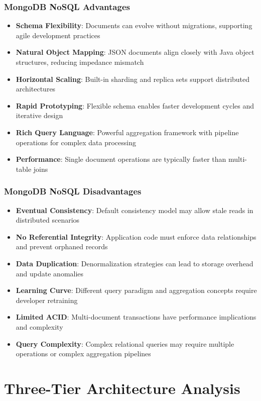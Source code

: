 \documentclass[12pt,a4paper]{article}
\begin{document}
\subsubsection{MongoDB NoSQL Advantages}
\begin{itemize}
    \item \textbf{Schema Flexibility}: Documents can evolve without migrations, supporting agile development practices
    \item \textbf{Natural Object Mapping}: JSON documents align closely with Java object structures, reducing impedance mismatch
    \item \textbf{Horizontal Scaling}: Built-in sharding and replica sets support distributed architectures
    \item \textbf{Rapid Prototyping}: Flexible schema enables faster development cycles and iterative design
    \item \textbf{Rich Query Language}: Powerful aggregation framework with pipeline operations for complex data processing
    \item \textbf{Performance}: Single document operations are typically faster than multi-table joins
\end{itemize}

\subsubsection{MongoDB NoSQL Disadvantages}
\begin{itemize}
    \item \textbf{Eventual Consistency}: Default consistency model may allow stale reads in distributed scenarios
    \item \textbf{No Referential Integrity}: Application code must enforce data relationships and prevent orphaned records
    \item \textbf{Data Duplication}: Denormalization strategies can lead to storage overhead and update anomalies
    \item \textbf{Learning Curve}: Different query paradigm and aggregation concepts require developer retraining
    \item \textbf{Limited ACID}: Multi-document transactions have performance implications and complexity
    \item \textbf{Query Complexity}: Complex relational queries may require multiple operations or complex aggregation pipelines
\end{itemize}

\section{Three-Tier Architecture Analysis}
\end{document}
